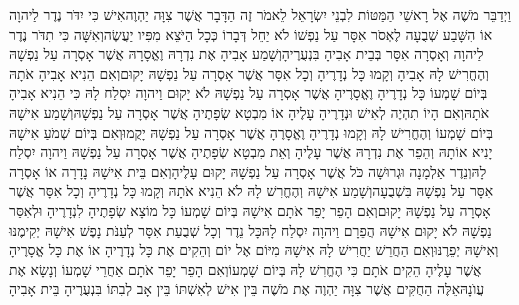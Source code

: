 \documentclass[../main/main.tex]{subfiles}
\begin{document}
\begin{multicols*}{\ncols}
וַיְדַבֵּר מֹשֶׁה אֶל רָאשֵׁי הַמַּטּוֹת לִבְנֵי יִשְׂרָאֵל לֵאמֹר זֶה הַדָּבָר אֲשֶׁר צִוָּה יַהְוֶה\PreVerseSpace{}אִישׁ כִּי יִדֹּר נֶדֶר לַיהוָה אוֹ הִשָּׁבַע שְׁבֻעָה לֶאְסֹר אִסָּר עַל נַפְשׁוֹ לֹא יַחֵל דְּבָרוֹ כְּכָל הַיֹּצֵא מִפִּיו יַעֲשֶׂה\PreVerseSpace{}וְאִשָּׁה כִּי תִדֹּר נֶדֶר לַיהוָה וְאָסְרָה אִסָּר בְּבֵית אָבִיהָ בִּנְעֻרֶיהָ\PreVerseSpace{}וְשָׁמַע אָבִיהָ אֶת נִדְרָהּ וֶאֱסָרָהּ אֲשֶׁר אָסְרָה עַל נַפְשָׁהּ וְהֶחֱרִישׁ לָהּ אָבִיהָ וְקָמוּ כָּל נְדָרֶיהָ וְכָל אִסָּר אֲשֶׁר אָסְרָה עַל נַפְשָׁהּ יָקוּם\PreVerseSpace{}וְאִם הֵנִיא אָבִיהָ אֹתָהּ בְּיוֹם שָׁמְעוֹ כָּל נְדָרֶיהָ וֶאֱסָרֶיהָ אֲשֶׁר אָסְרָה עַל נַפְשָׁהּ לֹא יָקוּם וַיהוָה יִסְלַח לָהּ כִּי הֵנִיא אָבִיהָ אֹתָהּ\PreVerseSpace{}וְאִם הָיוֹ תִהְיֶה לְאִישׁ וּנְדָרֶיהָ עָלֶיהָ אוֹ מִבְטָא שְׂפָתֶיהָ אֲשֶׁר אָסְרָה עַל נַפְשָׁהּ\PreVerseSpace{}וְשָׁמַע אִישָׁהּ בְּיוֹם שָׁמְעוֹ וְהֶחֱרִישׁ לָהּ וְקָמוּ נְדָרֶיהָ וֶאֱסָרֶהָ אֲשֶׁר אָסְרָה עַל נַפְשָׁהּ יָקֻמוּ\PreVerseSpace{}וְאִם בְּיוֹם שְׁמֹעַ אִישָׁהּ יָנִיא אוֹתָהּ וְהֵפֵר אֶת נִדְרָהּ אֲשֶׁר עָלֶיהָ וְאֵת מִבְטָא שְׂפָתֶיהָ אֲשֶׁר אָסְרָה עַל נַפְשָׁהּ וַיהוָה יִסְלַח לָהּ\PreVerseSpace{}וְנֵדֶר אַלְמָנָה וּגְרוּשָׁה כֹּל אֲשֶׁר אָסְרָה עַל נַפְשָׁהּ יָקוּם עָלֶיהָ\PreVerseSpace{}וְאִם בֵּית אִישָׁהּ נָדָרָה אוֹ אָסְרָה אִסָּר עַל נַפְשָׁהּ בִּשְׁבֻעָה\PreVerseSpace{}וְשָׁמַע אִישָׁהּ וְהֶחֱרִשׁ לָהּ לֹא הֵנִיא אֹתָהּ וְקָמוּ כָּל נְדָרֶיהָ וְכָל אִסָּר אֲשֶׁר אָסְרָה עַל נַפְשָׁהּ יָקוּם\PreVerseSpace{}וְאִם הָפֵר יָפֵר אֹתָם אִישָׁהּ בְּיוֹם שָׁמְעוֹ כָּל מוֹצָא שְׂפָתֶיהָ לִנְדָרֶיהָ וּלְאִסַּר נַפְשָׁהּ לֹא יָקוּם אִישָׁהּ הֲפֵרָם וַיהוָה יִסְלַח לָהּ\PreVerseSpace{}כָּל נֵדֶר וְכָל שְׁבֻעַת אִסָּר לְעַנֹּת נָפֶשׁ אִישָׁהּ יְקִימֶנּוּ וְאִישָׁהּ יְפֵרֶנּוּ\PreVerseSpace{}וְאִם הַחֲרֵשׁ יַחֲרִישׁ לָהּ אִישָׁהּ מִיּוֹם אֶל יוֹם וְהֵקִים אֶת כָּל נְדָרֶיהָ אוֹ אֶת כָּל אֱסָרֶיהָ אֲשֶׁר עָלֶיהָ הֵקִים אֹתָם כִּי הֶחֱרִשׁ לָהּ בְּיוֹם שָׁמְעוֹ\PreVerseSpace{}וְאִם הָפֵר יָפֵר אֹתָם אַחֲרֵי שָׁמְעוֹ וְנָשָׂא אֶת עֲוֺנָהּ\PreVerseSpace{}אֵלֶּה הַחֻקִּים אֲשֶׁר צִוָּה יַהְוֶה אֶת מֹשֶׁה בֵּין אִישׁ לְאִשְׁתּוֹ בֵּין אָב לְבִתּוֹ בִּנְעֻרֶיהָ בֵּית אָבִיהָ\OpenSection{}\par

\end{multicols*}
\end{document}
